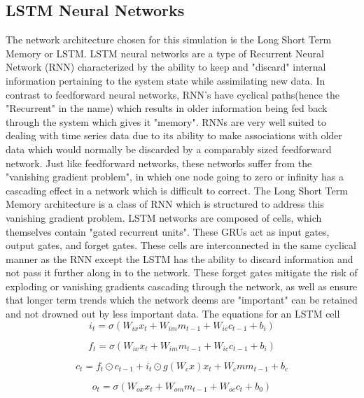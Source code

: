 \documentclass[twocolumn,letterpaper]{IEEEAerospaceCLS}  %
\begin{document}
\subsection{LSTM Neural Networks}
The network architecture chosen for this simulation is the Long Short Term Memory or LSTM. LSTM neural networks are a type of Recurrent Neural Network (RNN) characterized by the ability to keep and "discard" internal information pertaining to the system state while assimilating new data. In contrast to feedforward neural networks, RNN's have cyclical paths(hence the "Recurrent" in the name) which results in older information being fed back through the system which gives it "memory". RNNs are very well suited to dealing with time series data due to its ability to make associations with older data which would normally be discarded by a comparably sized feedforward network. Just like feedforward networks, these networks suffer from the "vanishing gradient problem", in which one node going to zero or infinity has a cascading effect in a network which is difficult to correct.
	The Long Short Term Memory architecture is a class of RNN which is structured to address this vanishing gradient problem. LSTM networks are composed of cells, which themselves contain "gated recurrent units". These GRUs act as input gates, output gates, and forget gates. These cells are interconnected in the same cyclical manner as the RNN except the LSTM has the ability to discard information and not pass it further along in to the network. These forget gates mitigate the risk of exploding or vanishing gradients cascading through the network, as well as ensure that longer term trends which the network deems are "important" can be retained and not drowned out by less important data.
	The equations for an LSTM cell
\begin{equation}
i_t = \sigma (W_{ix} x_t + W_{im} m_{t-1} + W_{ic} c_{t-1} + b_i)
\end{equation}

\begin{equation}
f_t = \sigma (W_{ix} x_t + W_{im} m_{t-1} + W_{ic} c_{t-1} + b_i)
\end{equation}

\begin{equation}
c_t = f_t \odot c_{t-1} + i_t \odot g (W_cx) x_t + W_cm m_{t-1} +b_c
\end{equation}

\begin{equation}
o_t = \sigma (W_{ox} x_t + W_{om} m_{t-1} + W_{oc} c_t + b_0)
\end{equation}
\end{document}
